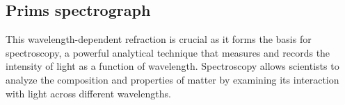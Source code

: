 \documentclass[
  a4paper,
]{book}
\begin{document}
\subsection{Prims spectrograph}\label{prims-spectrograph}

This wavelength-dependent refraction is crucial as it forms the basis
for spectroscopy, a powerful analytical technique that measures and
records the intensity of light as a function of wavelength. Spectroscopy
allows scientists to analyze the composition and properties of matter by
examining its interaction with light across different wavelengths.

\begin{figure}

\begin{minipage}{0.50\linewidth}



\end{minipage}%
%
\begin{minipage}{0.50\linewidth}

\end{minipage}
\end{figure}
\end{document}
